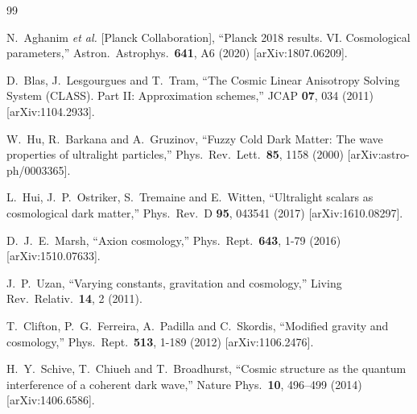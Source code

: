 \documentclass[aps,prd,onecolumn,nofootinbib,superscriptaddress]{revtex4-2}
\begin{document}



\begin{thebibliography}{99}

N.~Aghanim \textit{et al.} [Planck Collaboration],
``Planck 2018 results. VI. Cosmological parameters,''
Astron.\ Astrophys.\ \textbf{641}, A6 (2020)
[arXiv:1807.06209].

D.~Blas, J.~Lesgourgues and T.~Tram,
``The Cosmic Linear Anisotropy Solving System (CLASS). Part II: Approximation schemes,''
JCAP \textbf{07}, 034 (2011)
[arXiv:1104.2933].

W.~Hu, R.~Barkana and A.~Gruzinov,
``Fuzzy Cold Dark Matter: The wave properties of ultralight particles,''
Phys.\ Rev.\ Lett.\ \textbf{85}, 1158 (2000)
[arXiv:astro-ph/0003365].

L.~Hui, J.~P.~Ostriker, S.~Tremaine and E.~Witten,
``Ultralight scalars as cosmological dark matter,''
Phys.\ Rev.\ D \textbf{95}, 043541 (2017)
[arXiv:1610.08297].

D.~J.~E.~Marsh,
``Axion cosmology,''
Phys.\ Rept.\ \textbf{643}, 1-79 (2016)
[arXiv:1510.07633].

J.~P.~Uzan,
``Varying constants, gravitation and cosmology,''
Living Rev.\ Relativ.\ \textbf{14}, 2 (2011).

T.~Clifton, P.~G.~Ferreira, A.~Padilla and C.~Skordis,
``Modified gravity and cosmology,''
Phys.\ Rept.\ \textbf{513}, 1-189 (2012)
[arXiv:1106.2476].

H.~Y.~Schive, T.~Chiueh and T.~Broadhurst,
``Cosmic structure as the quantum interference of a coherent dark wave,''
Nature Phys.\ \textbf{10}, 496--499 (2014)
[arXiv:1406.6586].

\end{thebibliography}
\end{document}
